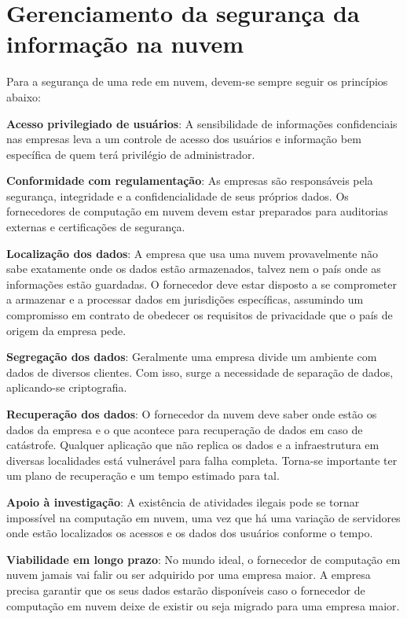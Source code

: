 \section{Gerenciamento da segurança da informação na nuvem}

Para a segurança de uma rede em nuvem, devem-se sempre seguir os princípios abaixo:

\newcommand{\itemm}[1]{\item\textbf{#1}}

\begin{itemise}

    \itemm{Acesso privilegiado de usuários}: A sensibilidade de informações
    confidenciais nas empresas leva a um controle de acesso dos usuários e
    informação bem específica de quem terá privilégio de administrador.
    
    \itemm{Conformidade com regulamentação}: As empresas são responsáveis pela
    segurança, integridade e a confidencialidade de seus próprios dados. Os
    fornecedores de computação em nuvem devem estar preparados para auditorias
    externas e certificações de segurança.
    
    \itemm{Localização dos dados}: A empresa que usa uma nuvem provavelmente não
    sabe exatamente onde os dados estão armazenados, talvez nem o país onde as
    informações estão guardadas. O fornecedor deve estar disposto a se comprometer a
    armazenar e a processar dados em jurisdições específicas, assumindo um
    compromisso em contrato de obedecer os requisitos de privacidade que o país de
    origem da empresa pede.
    
    \itemm{Segregação dos dados}: Geralmente uma empresa divide um ambiente com
    dados de diversos clientes. Com isso, surge a necessidade de separação de dados,
    aplicando-se criptografia.
    
    \itemm{Recuperação dos dados}: O fornecedor da nuvem deve saber onde estão os
    dados da empresa e o que acontece para recuperação de dados em caso de
    catástrofe. Qualquer aplicação que não replica os dados e a infraestrutura em 
    diversas localidades está vulnerável para falha completa. Torna-se importante
    ter um plano de recuperação e um tempo estimado para tal.
    
    \itemm{Apoio à investigação}: A existência de atividades ilegais pode se tornar
    impossível na computação em nuvem, uma vez que há uma variação de servidores
    onde estão localizados os acessos e os dados dos usuários conforme o tempo.
    
    \itemm{Viabilidade em longo prazo}: No mundo ideal, o fornecedor de computação
    em nuvem jamais vai falir ou ser adquirido por uma empresa maior. A empresa
    precisa garantir que os seus dados estarão disponíveis caso o fornecedor de
    computação em nuvem deixe de existir ou seja migrado para uma empresa maior.
\end{itemise}
\undef\itemm

